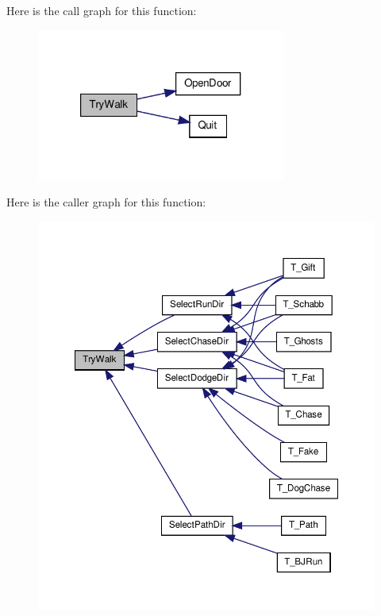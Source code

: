 Here is the call graph for this function:
\nopagebreak
\begin{figure}[H]
\begin{center}
\leavevmode
\includegraphics[width=232pt]{WL__STATE_8C_afc2aee564bbde3329ca837f177130917_cgraph}
\end{center}
\end{figure}




Here is the caller graph for this function:
\nopagebreak
\begin{figure}[H]
\begin{center}
\leavevmode
\includegraphics[width=366pt]{WL__STATE_8C_afc2aee564bbde3329ca837f177130917_icgraph}
\end{center}
\end{figure}




